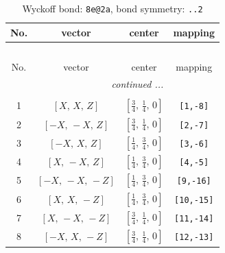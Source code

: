 \documentclass[fleqn,8pt]{jsarticle}
\begin{document}
\begin{longtable}{cccc}
\caption{Wyckoff bond: {\tt 8e@2a}, bond symmetry: {\tt ..2}}
 \\
 \hline \hline
No. & vector & center & mapping \\ \hline \endfirsthead

\multicolumn{3}{l}{\tablename\ \thetable{}} \\
 \hline \hline
No. & vector & center & mapping \\ \hline \endhead

 \hline \hline
\multicolumn{3}{r}{\footnotesize\it continued ...} \\ \endfoot

 \hline \hline
\multicolumn{3}{r}{} \\ \endlastfoot

1 & $\left[ X,\, X,\, Z \right]$ & $\left[ \frac{3}{4},\, \frac{1}{4},\, 0 \right]$ & {\tt [1,-8]} \\ \hline
2 & $\left[ - X,\, - X,\, Z \right]$ & $\left[ \frac{3}{4},\, \frac{1}{4},\, 0 \right]$ & {\tt [2,-7]} \\ \hline
3 & $\left[ - X,\, X,\, Z \right]$ & $\left[ \frac{1}{4},\, \frac{3}{4},\, 0 \right]$ & {\tt [3,-6]} \\ \hline
4 & $\left[ X,\, - X,\, Z \right]$ & $\left[ \frac{1}{4},\, \frac{3}{4},\, 0 \right]$ & {\tt [4,-5]} \\ \hline
5 & $\left[ - X,\, - X,\, - Z \right]$ & $\left[ \frac{1}{4},\, \frac{3}{4},\, 0 \right]$ & {\tt [9,-16]} \\ \hline
6 & $\left[ X,\, X,\, - Z \right]$ & $\left[ \frac{1}{4},\, \frac{3}{4},\, 0 \right]$ & {\tt [10,-15]} \\ \hline
7 & $\left[ X,\, - X,\, - Z \right]$ & $\left[ \frac{3}{4},\, \frac{1}{4},\, 0 \right]$ & {\tt [11,-14]} \\ \hline
8 & $\left[ - X,\, X,\, - Z \right]$ & $\left[ \frac{3}{4},\, \frac{1}{4},\, 0 \right]$ & {\tt [12,-13]} \\
\end{longtable}
\renewcommand{\arraystretch}{1.2}
\end{document}
